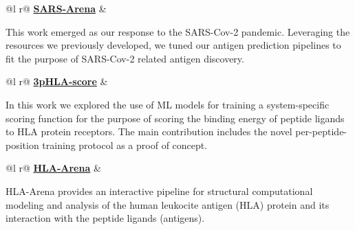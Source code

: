 \documentclass[a4paper,12pt]{article}
\begin{document}
\begin{tabularx}{\linewidth}{ @{}l r@{} }
 \href{https://github.com/KavrakiLab/SARS-Arena}{\faGithub \textbf{SARS-Arena}} &\\[3.75pt]
\begin{minipage}[t]{\linewidth}
This work emerged as our response to the SARS-Cov-2 pandemic. Leveraging the resources we previously developed, we tuned our antigen prediction pipelines to fit the purpose of SARS-Cov-2 related antigen discovery. %
\end{minipage}
\end{tabularx}

\begin{tabularx}{\linewidth}{ @{}l r@{} }
 \href{https://github.com/KavrakiLab/3pHLA-score}{\faGithub \textbf{3pHLA-score}} &\\[3.75pt]
\begin{minipage}[t]{\linewidth}
In this work we explored the use of ML models for training a system-specific scoring function for the purpose of scoring the binding energy of peptide ligands to HLA protein receptors. The main contribution includes the novel per-peptide-position training protocol as a proof of concept. %
\end{minipage}
\end{tabularx}

\begin{tabularx}{\linewidth}{ @{}l r@{} }
 \href{https://github.com/KavrakiLab/HLA-Arena}{\faGithub \textbf{HLA-Arena}} &\\[3.75pt]
\begin{minipage}[t]{\linewidth}
HLA-Arena provides an interactive pipeline for structural computational modeling and analysis of the human leukocite antigen (HLA) protein and its interaction with the peptide ligands (antigens). %
\end{minipage}
\end{tabularx}


\end{document}
